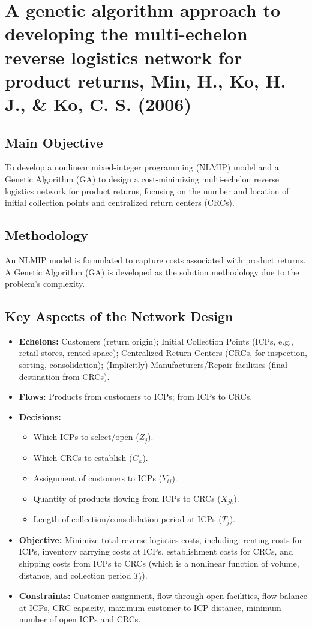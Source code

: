 \section{{A genetic algorithm approach to developing the multi-echelon reverse logistics network for product returns, Min, H., Ko, H. J., \& Ko, C. S. (2006)}}

\subsection*{Main Objective}
To develop a nonlinear mixed-integer programming (NLMIP) model and a Genetic Algorithm (GA) to design a cost-minimizing multi-echelon reverse logistics network for product returns, focusing on the number and location of initial collection points and centralized return centers (CRCs).

\subsection*{Methodology}
An NLMIP model is formulated to capture costs associated with product returns. A Genetic Algorithm (GA) is developed as the solution methodology due to the problem's complexity.

\subsection*{Key Aspects of the Network Design}
\begin{itemize}
    \item \textbf{Echelons:} Customers (return origin); Initial Collection Points (ICPs, e.g., retail stores, rented space); Centralized Return Centers (CRCs, for inspection, sorting, consolidation); (Implicitly) Manufacturers/Repair facilities (final destination from CRCs).
    \item \textbf{Flows:} Products from customers to ICPs; from ICPs to CRCs.
    \item \textbf{Decisions:}
        \begin{itemize}
            \item Which ICPs to select/open ($Z_j$).
            \item Which CRCs to establish ($G_k$).
            \item Assignment of customers to ICPs ($Y_{ij}$).
            \item Quantity of products flowing from ICPs to CRCs ($X_{jk}$).
            \item Length of collection/consolidation period at ICPs ($T_j$).
        \end{itemize}
    \item \textbf{Objective:} Minimize total reverse logistics costs, including: renting costs for ICPs, inventory carrying costs at ICPs, establishment costs for CRCs, and shipping costs from ICPs to CRCs (which is a nonlinear function of volume, distance, and collection period $T_j$).
    \item \textbf{Constraints:} Customer assignment, flow through open facilities, flow balance at ICPs, CRC capacity, maximum customer-to-ICP distance, minimum number of open ICPs and CRCs.
\end{itemize}

